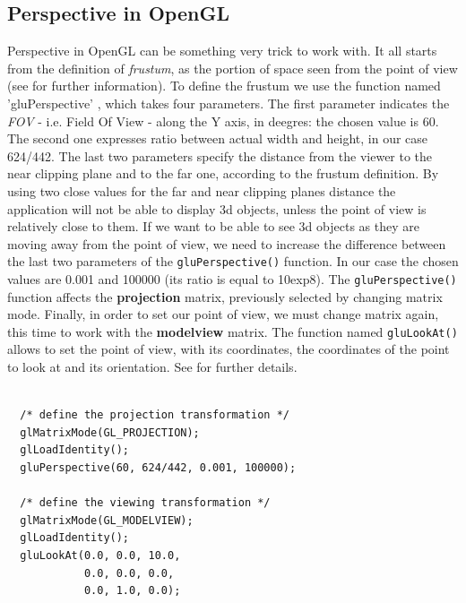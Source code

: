 \subsection{Perspective in OpenGL}
Perspective in OpenGL can be something very trick to work with. 
It all starts from the definition of \textit{frustum}, as the portion
of space seen from the point of view (see \cite{wiki:frustum} 
for further information). To define the frustum we use the function
named 'gluPerspective' \cite{opengl:gluPerspective}, which takes 
four parameters.
%
The first parameter indicates the \textit{FOV} - i.e. Field Of View -
along the Y axis, in deegres: the chosen value is 60. The
second one expresses ratio between actual width and height, 
in our case 624/442. The last two parameters specify the distance 
from the viewer to the near clipping plane and to the far one, 
according to the frustum definition.
%
By using two close values for the far and near clipping planes 
distance the application will not be able to display 3d
objects, unless the point of view is relatively close to them. 
If we want to be able to see 3d objects as they are moving away
from the point of view, we need to increase the difference between 
the last two parameters of the \texttt{gluPerspective()} function. In
our case the chosen values are 0.001 and 100000 (its ratio is 
equal to 10exp8).
%
The \texttt{gluPerspective()} function affects the \textbf{projection} 
matrix, previously selected by changing matrix mode. Finally,
in order to set our point of view, we must change matrix again, 
this time to work with the \textbf{modelview} matrix. The function named
\texttt{gluLookAt()} allows to set the point of view, with its coordinates, 
the coordinates of the point to look at and its orientation.
%
See \cite{opengl:gluLookAt} for further details.
%
\begin{lstlisting}[caption={OpenGL perspective example}, label={code:perspective}, frame=trBL]

  /* define the projection transformation */
  glMatrixMode(GL_PROJECTION);
  glLoadIdentity();
  gluPerspective(60, 624/442, 0.001, 100000);
  
  /* define the viewing transformation */
  glMatrixMode(GL_MODELVIEW);
  glLoadIdentity();
  gluLookAt(0.0, 0.0, 10.0,
            0.0, 0.0, 0.0,
            0.0, 1.0, 0.0);

\end{lstlisting}
